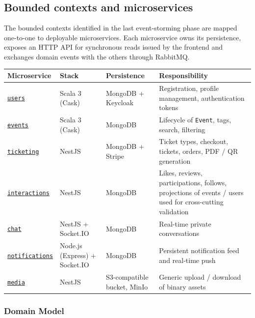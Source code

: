 \subsection{Bounded contexts and microservices}

The bounded contexts identified in the last event-storming phase are mapped one-to-one to deployable microservices. Each microservice owns its persistence, exposes an HTTP API for synchronous reads issued by the frontend and exchanges domain events with the others through RabbitMQ.

\begin{longtable}{|L{3.6cm}|L{2.3cm}|L{2.7cm}|L{5.7cm}|}
\hline
\textbf{Microservice} & \textbf{Stack} & \textbf{Persistence} & \textbf{Responsibility} \\
\hline
\endhead
\href{https://github.com/EvenToNight/EvenToNight/tree/main/services/users}{\texttt{users}} & Scala 3 (Cask) & MongoDB + Keycloak & Registration, profile management, authentication tokens \\
\hline
\href{https://github.com/EvenToNight/EvenToNight/tree/main/services/events}{\texttt{events}} & Scala 3 (Cask) & MongoDB & Lifecycle of \texttt{Event}, tags, search, filtering \\
\hline
\href{https://github.com/EvenToNight/EvenToNight/tree/main/services/ticketing}{\texttt{ticketing}} & NestJS & MongoDB + Stripe & Ticket types, checkout, tickets, orders, PDF / QR generation \\
\hline
\href{https://github.com/EvenToNight/EvenToNight/tree/main/services/interactions}{\texttt{interactions}} & NestJS & MongoDB & Likes, reviews, participations, follows, projections of events / users used for cross-cutting validation \\
\hline
\href{https://github.com/EvenToNight/EvenToNight/tree/main/services/chat}{\texttt{chat}} & NestJS + Socket.IO & MongoDB & Real-time private conversations \\
\hline
\href{https://github.com/EvenToNight/EvenToNight/tree/main/services/notifications}{\texttt{notifications}} & Node.js (Express) + Socket.IO & MongoDB & Persistent notification feed and real-time push \\
\hline
\href{https://github.com/EvenToNight/EvenToNight/tree/main/services/media}{\texttt{media}} & NestJS & S3-compatible bucket, MinIo & Generic upload / download of binary assets \\
\hline
\end{longtable}

\subsubsection{Domain Model}

